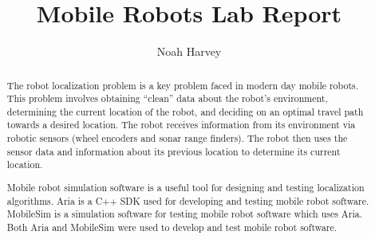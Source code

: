 \documentclass[a4paper,titlepage]{article}
\begin{document}
	\title{Mobile Robots Lab Report}
	\author{Noah Harvey}
	\maketitle

	\begin{abstract}

	The robot localization problem is a key problem faced in modern day mobile
	robots. This problem involves obtaining ``clean'' data about the robot's
	environment, determining the current location of the robot, and deciding on an
	optimal travel path towards a desired location. The robot receives information
	from its environment via robotic sensors (wheel encoders and sonar range
	finders). The robot then uses the sensor data and information about its
	previous location to determine its current location.

	Mobile robot simulation software is a useful tool for designing and testing
	localization algorithms. Aria is a C++ SDK used for developing and
	testing mobile robot software. MobileSim is a simulation software
	for testing mobile robot software which uses Aria. Both Aria and MobileSim
	were used to develop and test mobile robot software.
	
	\end{abstract}

	\tableofcontents
	\listoftables
	\listoffigures

	\pagebreak
	
	
	
	
	
\end{document}
